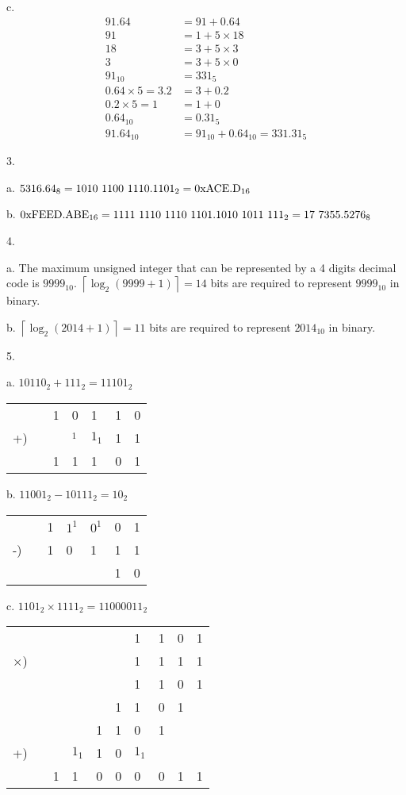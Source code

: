 \documentclass[UTF8,12pt,letterpaper,oneside]{amsart}
\begin{document}
c. \begin{equation*}\begin{split}
91.64 &= 91 + 0.64\\
91 &= 1 + 5 \times 18\\
18 &= 3 + 5 \times 3\\
 3 &= 3 + 5 \times 0\\
91_{10} &= 331_5\\ 
0.64 \times 5 = 3.2 &= 3 + 0.2\\
0.2  \times 5 = 1   &= 1 + 0\\
0.64_{10} &= 0.31_5\\
91.64_{10} &= 91_{10} + 0.64_{10} = 331.31_5
\end{split}\end{equation*}

3.

a. $\rm 5316.64_8 = 1010\ 1100\ 1110.1101_2 = 0xACE.D_{16}$

b. $\rm 0xFEED.ABE_{16} = 1111\ 1110\ 1110\ 1101.1010\ 1011\ 111_2 = 17\ 7355.5276_8$ 

4.

a. The maximum unsigned integer that can be represented by a 4 digits decimal code is $9999_{10}$. $\left \lceil \log_2 (9999 + 1) \right \rceil = 14$ bits are required to represent $9999_{10}$ in binary.

b. $\left \lceil \log_2 (2014 + 1) \right \rceil = 11$ bits are required to represent $2014_{10}$ in binary.

5.

a. $10110_2 + 111_2 = 11101_2$

\begin{tabular}{lllllll}
   &   & 1 & 0       & 1   & 1 & 0\\
+) &   &   & ${}_1$  & $1_1$ & 1 & 1\\\hline
   &   & 1 & 1       & 1   & 0 & 1
\end{tabular}   

b. $11001_2 - 10111_2 = 10_2$

\begin{tabular}{lllllll}
   &   & 1 & $1^1$ & $0^1$ & 0 & 1\\
-) &   & 1 &     0 &     1 & 1 & 1\\\hline
   &   &   &   &   & 1 & 0
\end{tabular}

c. $1101_2 \times 1111_2 = 11000011_2$

\begin{tabular}{llllllllll}
          &   &   &   &   &   & 1 & 1 & 0 & 1\\
$\times$) &   &   &   &   &   & 1 & 1 & 1 & 1\\\hline
          &   &   &   &   &   & 1 & 1 & 0 & 1\\
          &   &   &   &   & 1 & 1 & 0 & 1 &  \\  
          &   &   &   & 1 & 1 & 0 & 1 &   &  \\
+)        &   &   & $1_1$ & 1 & 0 & $1_1$ &   &   &  \\\hline  
          &   & 1 & 1 & 0 & 0 & 0 & 0 & 1 & 1   
\end{tabular}                                          
\end{document}
